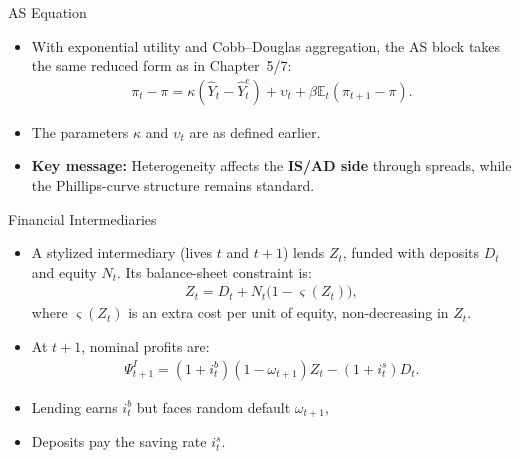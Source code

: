 \documentclass[11pt,aspectratio=169]{beamer}
\newcommand{\E}{\mathbb{E}}
\begin{document}
\begin{frame}{AS Equation}
\small
\begin{itemize}
  \item With exponential utility and Cobb--Douglas aggregation, the AS block takes the same reduced form as in Chapter~5/7:
  \begin{align}
    \pi_t-\pi
    =\kappa(\hat{Y}_t-\hat{Y}_t^{e})
    +\upsilon_t
    +\beta\E_t(\pi_{t+1}-\pi).
    \label{eq19}
  \end{align}
  \item The parameters $\kappa$ and $\upsilon_t$ are as defined earlier.
  \vspace{0.25em}
  \item \textbf{Key message:} Heterogeneity affects the \textbf{IS/AD side} through spreads, while the Phillips-curve structure remains standard.
\end{itemize}
\end{frame}

\begin{frame}{Financial Intermediaries}
\small
\begin{itemize}
  \item A stylized intermediary (lives $t$ and $t+1$) lends $Z_t$, funded with deposits $D_t$ and equity $N_t$.
  Its balance-sheet constraint is:
  \begin{align}
    Z_t = D_t + N_t\big(1-\varsigma(Z_t)\big),
    \label{eq20}
  \end{align}
  where $\varsigma(Z_t)$ is an extra cost per unit of equity, non-decreasing in $Z_t$.
  \vspace{0.35em}
  \item At $t+1$, nominal profits are:
  \begin{align}
    \Psi_{t+1}^I
    =(1+i_t^b)(1-\omega_{t+1})Z_t-(1+i_t^s)D_t.
    \label{eq21}
  \end{align}
    \item Lending earns $i_t^b$ but faces random default $\omega_{t+1}$,
    \item Deposits pay the saving rate $i_t^s$.
\end{itemize}
\end{frame}
\end{document}
